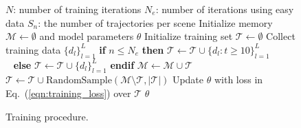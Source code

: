 \begin{wrapfigure}{r}{0.55\textwidth}
\vspace{-2.5em}
\begin{minipage}{0.55\textwidth}
\begin{algorithm}[H]
\caption{Training procedure.}
\label{alg:training}
\begin{algorithmic}
\small
\State $N$: number of training iterations
\State $N_{e}$: number of iterations using easy data
\State $S_n$: the number of trajectories per scene
\State Initialize memory $\mathcal{M} \leftarrow \emptyset$ and model parameters $\theta$
    \State Initialize training set $\mathcal{T} \leftarrow \emptyset$
            \State Collect training data $\{d_l\}_{l=1}^L$
            \State \textbf{if} $n \leq N_e$ \textbf{then} $\mathcal{T} \leftarrow  \mathcal{T} \cup \{d_l: t \geq 10\}_{l=1}^L$ \\ \qquad\qquad~ \textbf{else} $\mathcal{T} \leftarrow \mathcal{T} \cup \{d_l\}_{l=1}^L$ \textbf{endif}
        \EndFor
    \EndFor
    \State $\mathcal{M} \leftarrow \mathcal{M} \cup \mathcal{T}$
    \State $\mathcal{T} \leftarrow \mathcal{T} \cup \text{RandomSample}(\mathcal{M} \setminus \mathcal{T}, |\mathcal{T}|)$
        \State Update $\theta$ with loss in Eq.~(\ref{eqn:training_loss}) over $\mathcal{T}$
    \EndFor
\EndFor
\State \Return $\theta$
\end{algorithmic}
\end{algorithm}
\end{minipage}
\vspace{-2em}
\end{wrapfigure}